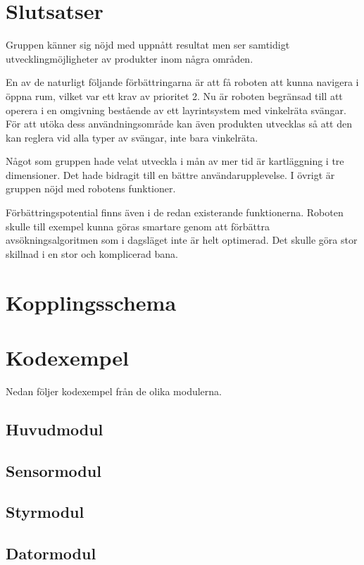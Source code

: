 \documentclass[11pt]{article}
\begin{document}
\begin{flushleft}
\pagebreak
\section{Slutsatser}Gruppen känner sig nöjd med uppnått resultat men ser samtidigt utvecklingmöjligheter av produkter inom några områden. 

En av de naturligt följande förbättringarna är att få roboten att kunna navigera i öppna rum, vilket var ett krav av prioritet 2. Nu är roboten begränsad till att operera i en omgivning bestående av ett layrintsystem med vinkelräta svängar. För att utöka dess användningsområde kan även produkten utvecklas så att den kan reglera vid alla typer av svängar, inte bara vinkelräta.

Något som gruppen hade velat utveckla i mån av mer tid är kartläggning i tre dimensioner. Det hade bidragit till en bättre användarupplevelse. I övrigt är gruppen nöjd med robotens funktioner. 

Förbättringspotential finns även i de redan existerande funktionerna. Roboten skulle till exempel kunna göras smartare genom att förbättra avsökningsalgoritmen som i dagsläget inte är helt optimerad. Det skulle göra stor skillnad i en stor och komplicerad bana. 
\pagebreak





\pagebreak
\appendix
\section{Kopplingsschema}

\section{Kodexempel} \label{App:AppendixA}
Nedan följer kodexempel från de olika modulerna.

\subsection{Huvudmodul}


\subsection{Sensormodul}


\subsection{Styrmodul}


\subsection{Datormodul}






\pagebreak


\end{flushleft}
\end{document}
